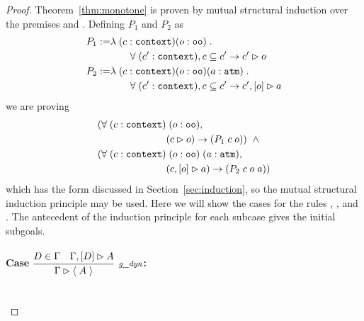 \begin{proof}

Theorem~\ref{thm:monotone} is proven by mutual structural induction over the premises \seqsl{\beta} and \bchsl{\beta}{\alpha}. Defining $P_1$ and $P_2$ as
\begin{align*}
P_1 :=& \lambda \; (c : \sltm{context}) (o : \sltm{oo}) \; . \\
& \qquad \forall \; (\inddyncon{} : \sltm{context}), c \subseteq \inddyncon{} \rightarrow \seqsl[\inddyncon{}]{o} \\
P_2 :=& \lambda \; (c : \sltm{context}) (o : \sltm{oo}) (a : \sltm{atm}) \; . \\
& \qquad \forall \; (\inddyncon{} : \sltm{context}), c \subseteq \inddyncon{} \rightarrow \bchsl[\inddyncon{}]{o}{a}
\end{align*}
we are proving
\begin{align*}
(\forall \; (c : \sltm{context}) & \; (o : \sltm{oo}), \\
& (\seqsl[c]{o}) \rightarrow (P_1 \; c \; o)) \;\; \wedge \\
(\forall \; (c : \sltm{context}) & \; (o : \sltm{oo}) \; (a : \sltm{atm}), \\
& (\bchsl[c]{o}{a}) \rightarrow (P_2 \; c \; o \; a))
\end{align*}
which has the form discussed in Section~\ref{sec:induction}, so the mutual structural induction principle may be used. Here we will show the cases for the rules \rlnmsinit{}, \rlnmsimp{}, and \rlnmbimp{}. The antecedent of the induction principle for each subcase gives the initial subgoals.\\

\paragraph{Case $\vcenter{\rlsinit{}}$:} ~\\

\smallskip


\end{proof}

